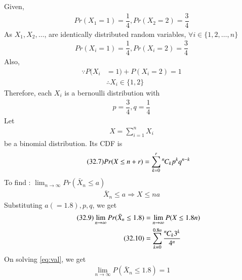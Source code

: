 
Given,
\begin{align}
\tag{32.1}
    Pr(X_{1}=1)=\dfrac{1}{4},Pr(X_{2}=2)=\dfrac{3}{4}
\end{align}
As $X_{1},X_{2},\dots$, are identically distributed random variables, $\forall i \in \{1,2,\dots,n\}$
\begin{align}
\tag{32.2}
    Pr(X_{i}=1)=\dfrac{1}{4},Pr(X_{i}=2)=\dfrac{3}{4}
\end{align}
Also,
\begin{align}
\tag{32.3}
    \because P(X_{i}&=1)+P(X_{i}=2)=1\\
\tag{32.4}
    &\therefore X_{i} \in \{1,2\}
\end{align}
Therefore, each $X_{i}$ is a bernoulli distribution with
\begin{align}
\tag{32.5}
    p=\dfrac{3}{4},q=\dfrac{1}{4}
\end{align}
Let
\begin{align}
\tag{32.6}
    X=\displaystyle\sum_{i=1}^{n}X_{i}
\end{align}
be a binomial distribution. Its CDF is
\begin{align}
\tag{32.7}
    Pr(X\leq n+r)=\displaystyle\sum_{k=0}^{r}{{{}^{n}\mkern-1muC_{k}}}p^{k}q^{n-k}
\end{align}
To find : $\displaystyle\lim_{n\to\infty}Pr(\bar X_{n} \leq a)$
\begin{align}
\tag{32.8}
    \bar X_{n} \leq a \Rightarrow X \leq na
\end{align}
Substituting $a(=1.8),p,q$, we get
\begin{align}
\tag{32.9}
    \displaystyle\lim_{n\to\infty}Pr(\bar X_{n} \leq 1.8)&=\displaystyle\lim_{n\to\infty}P(X\leq 1.8n)\\
\tag{32.10} 
    &=\displaystyle\sum_{k=0}^{0.8n}\dfrac{{{{}^{n}\mkern-1muC_{k}}}3^{k}}{4^{n}}
\label{eq:val}
\end{align}
On solving \eqref{eq:val}, we get
\begin{align}
\tag{32.11}
    \displaystyle\lim_{n\to\infty}P(\bar X_{n} \leq 1.8)=1
\end{align}
